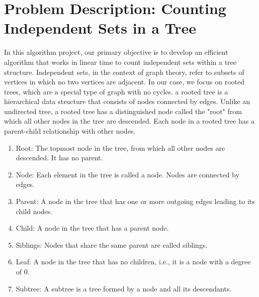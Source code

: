 \documentclass{article}
\begin{document}
\section*{Problem Description: Counting Independent Sets in a Tree}
In this algorithm project, our primary objective is to develop an efficient algorithm that works in linear time to count independent sets within a tree structure.
Independent sets, in the context of graph theory, refer to subsets of vertices in which no two vertices are adjacent. In our case, we focus on rooted trees, 
which are a special type of graph with no cycles.
a rooted tree is a hierarchical data structure that consists of nodes connected by edges. Unlike an undirected tree, a rooted tree has a distinguished node called the "root" from which all other nodes in the tree are descended. Each node in a rooted tree has a parent-child relationship with other nodes.
\begin{enumerate}
  \item Root: The topmost node in the tree, from which all other nodes are descended. It has no parent.

  \item Node: Each element in the tree is called a node. Nodes are connected by edges.
  
  \item Parent: A node in the tree that has one or more outgoing edges leading to its child nodes.
  
  \item Child: A node in the tree that has a parent node.
  
  \item Siblings: Nodes that share the same parent are called siblings.
  
  \item Leaf: A node in the tree that has no children, i.e., it is a node with a degree of 0.
  
  \item Subtree: A subtree is a tree formed by a node and all its descendants.
\end{enumerate}
\end{document}
